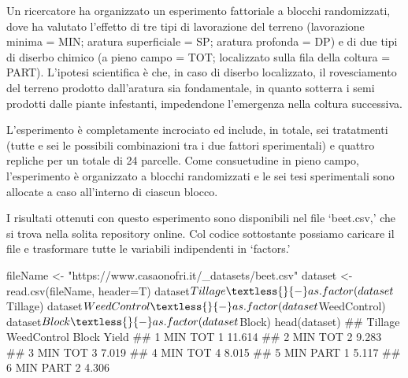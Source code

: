 \documentclass[a4paper,12pt,oneside]{book}
\newenvironment{Shaded}{\begin{snugshade}}{\end{snugshade}}
\newcommand{\SpecialCharTok}[1]{#1}
\newcommand{\StringTok}[1]{#1}
\newcommand{\DocumentationTok}[1]{#1}
\newcommand{\OtherTok}[1]{#1}
\newcommand{\FunctionTok}[1]{#1}
\newcommand{\AttributeTok}[1]{#1}
\newcommand{\NormalTok}[1]{#1}
\begin{document}
Un ricercatore ha organizzato un esperimento fattoriale a blocchi randomizzati, dove ha valutato l'effetto di tre tipi di lavorazione del terreno (lavorazione minima = MIN; aratura superficiale = SP; aratura profonda = DP) e di due tipi di diserbo chimico (a pieno campo = TOT; localizzato sulla fila della coltura = PART). L'ipotesi scientifica è che, in caso di diserbo localizzato, il rovesciamento del terreno prodotto dall'aratura sia fondamentale, in quanto sotterra i semi prodotti dalle piante infestanti, impedendone l'emergenza nella coltura successiva.

L'esperimento è completamente incrociato ed include, in totale, sei tratatmenti (tutte e sei le possibili combinazioni tra i due fattori sperimentali) e quattro repliche per un totale di 24 parcelle. Come consuetudine in pieno campo, l'esperimento è organizzato a blocchi randomizzati e le sei tesi sperimentali sono allocate a caso all'interno di ciascun blocco.

I risultati ottenuti con questo esperimento sono disponibili nel file `beet.csv,' che si trova nella solita repository online. Col codice sottostante possiamo caricare il file e trasformare tutte le variabili indipendenti in `factors.'

\begin{Shaded}
\begin{Highlighting}[]
\NormalTok{fileName }\OtherTok{\textless{}{-}} \StringTok{"https://www.casaonofri.it/\_datasets/beet.csv"}
\NormalTok{dataset }\OtherTok{\textless{}{-}} \FunctionTok{read.csv}\NormalTok{(fileName, }\AttributeTok{header=}\NormalTok{T)}
\NormalTok{dataset}\SpecialCharTok{$}\NormalTok{Tillage }\OtherTok{\textless{}{-}} \FunctionTok{as.factor}\NormalTok{(dataset}\SpecialCharTok{$}\NormalTok{Tillage)}
\NormalTok{dataset}\SpecialCharTok{$}\NormalTok{WeedControl }\OtherTok{\textless{}{-}} \FunctionTok{as.factor}\NormalTok{(dataset}\SpecialCharTok{$}\NormalTok{WeedControl)}
\NormalTok{dataset}\SpecialCharTok{$}\NormalTok{Block }\OtherTok{\textless{}{-}} \FunctionTok{as.factor}\NormalTok{(dataset}\SpecialCharTok{$}\NormalTok{Block)}
\FunctionTok{head}\NormalTok{(dataset)}
\DocumentationTok{\#\#   Tillage WeedControl Block  Yield}
\DocumentationTok{\#\# 1     MIN         TOT     1 11.614}
\DocumentationTok{\#\# 2     MIN         TOT     2  9.283}
\DocumentationTok{\#\# 3     MIN         TOT     3  7.019}
\DocumentationTok{\#\# 4     MIN         TOT     4  8.015}
\DocumentationTok{\#\# 5     MIN        PART     1  5.117}
\DocumentationTok{\#\# 6     MIN        PART     2  4.306}
\end{Highlighting}
\end{Shaded}
\end{document}

